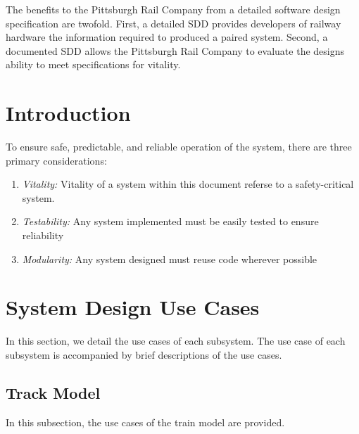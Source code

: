 \documentclass[]{article}
\begin{document}
The benefits to the Pittsburgh Rail Company from  a detailed software design specification are twofold. First, a detailed SDD provides developers of railway hardware the information required to produced a paired system. Second, a documented SDD allows the Pittsburgh Rail Company to evaluate the designs ability to meet specifications for vitality.

\section{Introduction}
To ensure safe, predictable, and reliable operation of the system, there are three primary considerations:
\begin{enumerate}
	\item \emph{Vitality:} Vitality of a system within this document referse to a safety-critical system.
	\item \emph{Testability:} Any system implemented must be easily tested to ensure reliability
	\item \emph{Modularity:} Any system designed must reuse code wherever possible
\end{enumerate}

\section{System Design Use Cases}
In this section, we detail the use cases of each subsystem. The use case of each subsystem is accompanied by brief descriptions of the use cases.

\subsection{Track Model}
In this subsection, the use cases of the train model are provided.
\end{document}
